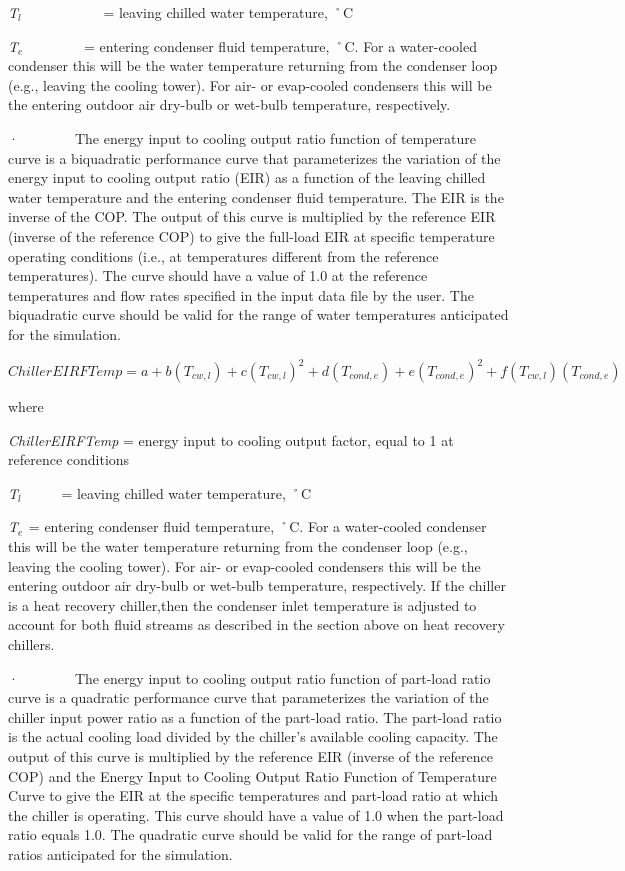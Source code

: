 \emph{T\(_{l}\)}~~~~~~~~~~~ = leaving chilled water temperature, ˚C

\emph{T\(_{e}\)}~~~~~~~~ = entering condenser fluid temperature, ˚C. For a water-cooled condenser this will be the water temperature returning from the condenser loop (e.g., leaving the cooling tower). For air- or evap-cooled condensers this will be the entering outdoor air dry-bulb or wet-bulb temperature, respectively.

·~~~~~~~~The energy input to cooling output ratio function of temperature curve is a biquadratic performance curve that parameterizes the variation of the energy input to cooling output ratio (EIR) as a function of the leaving chilled water temperature and the entering condenser fluid temperature. The EIR is the inverse of the COP. The output of this curve is multiplied by the reference EIR (inverse of the reference COP) to give the full-load EIR at specific temperature operating conditions (i.e., at temperatures different from the reference temperatures). The curve should have a value of 1.0 at the reference temperatures and flow rates specified in the input data file by the user. The biquadratic curve should be valid for the range of water temperatures anticipated for the simulation.

\begin{equation}
ChillerEIRFTemp = a + b\left( {{T_{cw,l}}} \right) + c{\left( {{T_{cw,l}}} \right)^2} + d\left( {{T_{cond,e}}} \right) + e{\left( {{T_{cond,e}}} \right)^2} + f\left( {{T_{cw,l}}} \right)\left( {{T_{cond,e}}} \right)
\end{equation}

where

\emph{ChillerEIRFTemp} = energy input to cooling output factor, equal to 1 at reference conditions

\emph{T\(_{l}\)}~~~~~ = leaving chilled water temperature, ˚C

\emph{T\(_{e}\)}\(_{ }\) = entering condenser fluid temperature, ˚C. For a water-cooled condenser this will be the water temperature returning from the condenser loop (e.g., leaving the cooling tower). For air- or evap-cooled condensers this will be the entering outdoor air dry-bulb or wet-bulb temperature, respectively. If the chiller is a heat recovery chiller,then the condenser inlet temperature is adjusted to account for both fluid streams as described in the section above on heat recovery chillers.

·~~~~~~~~The energy input to cooling output ratio function of part-load ratio curve is a quadratic performance curve that parameterizes the variation of the chiller input power ratio as a function of the part-load ratio. The part-load ratio is the actual cooling load divided by the chiller's available cooling capacity. The output of this curve is multiplied by the reference EIR (inverse of the reference COP) and the Energy Input to Cooling Output Ratio Function of Temperature Curve to give the EIR at the specific temperatures and part-load ratio at which the chiller is operating. This curve should have a value of 1.0 when the part-load ratio equals 1.0. The quadratic curve should be valid for the range of part-load ratios anticipated for the simulation.

